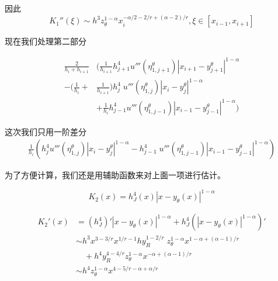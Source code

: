 \documentclass{ctexart}
\begin{document}
因此
\begin{equation}
    K_1''(\xi) \sim h^3 z_\theta^{1-\alpha} x_i^{-\alpha/2-2/r+(\alpha-2)/r} , \xi \in [x_{i-1}, x_{i+1}]
\end{equation}

现在我们处理第二部分

\begin{equation}
    \begin{aligned}
        \frac{2}{h_i + h_{i+1}} 
        & ( \frac{1}{h_{i+1}}  h_{j+1}^{4} u'''(\eta_{1,j+1}^\theta) |x_{i+1} - y_{j+1}^\theta|^{1-\alpha} \\
        - (\frac{1}{h_{i}} +& \frac{1}{h_{i+1}}) h_j^{4} \; u'''(\eta_{1,j}^\theta) |x_i - y_j^\theta|^{1-\alpha}    \\
        &+  \frac{1}{h_{i}} h_{j-1}^{4} u'''(\eta_{1,j-1}^\theta) |x_{i-1} - y_{j-1}^\theta|^{1-\alpha} )
    \end{aligned}
\end{equation}

这次我们只用一阶差分
\begin{equation}
    \begin{aligned}
        \frac{1}{h_{i}} ( h_{j}^{4} u'''(\eta_{1,j}^\theta) |x_{i} - y_{j}^\theta|^{1-\alpha} 
        - h_{j-1}^{4} \; u'''(\eta_{1,j-1}^\theta) |x_{i-1} - y_{j-1}^\theta|^{1-\alpha} )
    \end{aligned}
\end{equation}

为了方便计算，我们还是用辅助函数来对上面一项进行估计。

\begin{equation}
    K_2(x) = h_J^4(x)|x-y_\theta(x)|^{1-\alpha}
\end{equation}

\begin{equation}
    \begin{aligned}
        K_2'(x) &= (h_J^4)'|x-y_\theta(x)|^{1-\alpha} + h_J^4 (|x-y_\theta(x)|^{1-\alpha})' \\
        &\sim h^3 x^{3-3/r} x^{1/r-1} h y_R^{1-2/r} \; z_\theta^{1-\alpha} x^{1-\alpha+(\alpha-1)/r} \\
            &\quad + h^4 y_R^{4-4/r} z_\theta^{1-\alpha} x^{-\alpha + (\alpha-1)/r} \\
        &\sim h^4 z_\theta^{1-\alpha} x^{4-5/r-\alpha+\alpha/r}
    \end{aligned}
\end{equation}
\end{document}
